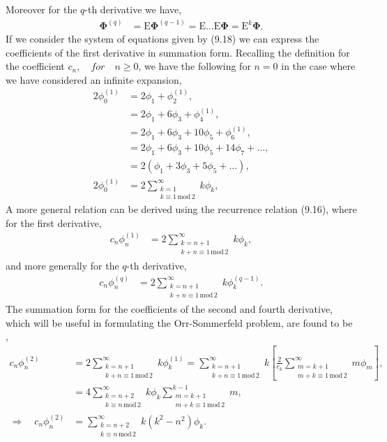 \documentclass[a4paper, 12pt, twoside, openright]{article}
\numberwithin{equation}{section}
\begin{document}
Moreover for the $q$-th derivative we have,
\begin{align}
\mathbf{\Phi}^{(q)} &= \mathrm{E}\mathbf{\Phi}^{(q-1)} = \mathrm{E} \dots \mathrm{E}\mathbf{\Phi} = \mathrm{E}^k \mathbf{\Phi}.
\end{align}
If we consider the system of equations given by (9.18) we can express the coefficients of the first derivative in summation form. Recalling the definition for the coefficient $c_n, \quad for \quad n\geq0$, we have the following for $n=0$ in the case where we have considered an infinite expansion,
\begin{align}
2\phi_0^{(1)} &= 2\phi_1 + \phi_2^{(1)}, \nonumber \\ 
 &= 2\phi_1 + 6\phi_3 + \phi_4^{(1)}, \nonumber \\
 &= 2\phi_1 + 6\phi_3 + 10\phi_5 + \phi_6^{(1)}, \nonumber \\
 &= 2\phi_1 + 6\phi_3 + 10\phi_5 + 14\phi_7 + \dots, \nonumber\\
 &= 2(\phi_1 + 3\phi_3 + 5\phi_5 + \dots) ,\nonumber \\
 2\phi_0^{(1)} &= 2 \sum_{\substack{k=1 \\ k\equiv 1\, \mathrm{mod}\, 2}}^{\infty} k\phi_k,
\end{align}   
A more general relation can be derived using the recurrence relation (9.16), where for the first derivative,
\begin{align}
c_n \phi_n^{(1)} &= 2 \sum_{\substack{k=n+1 \\ k+n\equiv 1\, \mathrm{mod}\, 2}}^{\infty} k\phi_k,
\end{align}
and more generally for the $q$-th derivative,
\begin{align}
c_n \phi_n^{(q)} &= 2 \sum_{\substack{k=n+1 \\ k+n\equiv 1\, \mathrm{mod}\, 2}}^{\infty} k\phi_k^{(q-1)}.
\end{align}
The summation form for the coefficients of the second and fourth derivative, which will be useful in formulating the Orr-Sommerfeld problem, are found to be ,
\begin{align}
c_n\phi_n^{(2)} &= 2 \sum_{\substack{k=n+1 \\ k+n\equiv 1\, \mathrm{mod}\, 2}}^{\infty} k\phi_k^{(1)} = \sum_{\substack{k=n+1 \\ k+n\equiv 1\, \mathrm{mod}\, 2}}^{\infty} k \left[\frac{2}{c_k} \sum_{\substack{m=k+1 \\ m+k\equiv 1\, \mathrm{mod}\, 2}}^{\infty} m\phi_m  \right], \nonumber \\
&= 4 \sum_{\substack{k=n+2 \\ k\equiv n\, \mathrm{mod}\, 2}}^{\infty} k\phi_k  \sum_{\substack{m=k+1 \\ m+k\equiv 1\, \mathrm{mod}\, 2}}^{k-1} m, \nonumber \\
\Rightarrow \quad c_n\phi_n^{(2)} &= \sum_{\substack{k=n+2 \\ k\equiv n\, \mathrm{mod}\, 2}}^{\infty} k(k^2 - n^2)\phi_k.  
\end{align} 
\end{document}
